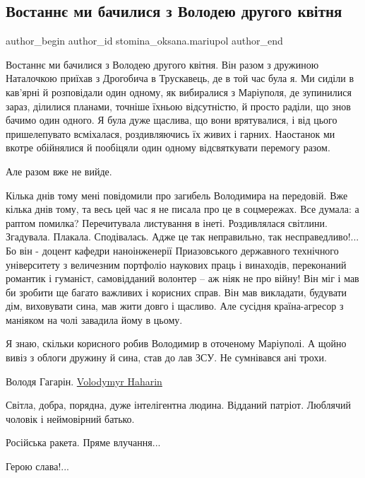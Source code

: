  
 
 
 
 

\subsection{Востаннє ми бачилися з Володею другого квітня}
\label{sec:26_02_2023.fb.stomina_oksana.mariupol.1.vostann__mi_bachilis}

\ifcmt
 author_begin
   author_id stomina_oksana.mariupol
 author_end
\fi

Востаннє ми бачилися з Володею другого квітня. Він разом з дружиною Наталочкою
приїхав з Дрогобича в Трускавець, де в той час була я. Ми сиділи в кав’ярні й
розповідали один одному, як вибиралися з Маріуполя, де зупинилися зараз,
ділилися планами, точніше їхньою відсутністю, й просто раділи, що знов бачимо
один одного.  Я була дуже щаслива, що вони врятувалися, і від цього
пришелепувато всміхалася, роздивляючись їх живих і гарних. Наостанок ми вкотре
обійнялися й пообіцяли один одному відсвяткувати перемогу разом. 

Але разом вже не вийде. 

Кілька днів тому мені повідомили про загибель Володимира на передовій. Вже
кілька днів тому, та весь цей час я не писала про це в соцмережах. Все думала:
а раптом помилка? Перечитувала листування в інеті. Роздивлялася світлини.
Згадувала. Плакала.  Сподівалась.  Адже це так неправильно, так
несправедливо!... Бо він - доцент кафедри наноінженерії Приазовського
державного технічного університету з величезним портфоліо наукових праць і
винаходів, переконаний романтик і гуманіст, самовідданий волонтер – аж ніяк не
про війну! Він міг і мав би зробити ще багато важливих і корисних справ. Він
мав викладати, будувати дім, виховувати сина, мав жити довго і щасливо. Але
сусідня країна-агресор з маніяком на чолі завадила йому в цьому.

Я знаю, скільки корисного робив Володимир в оточеному
Маріуполі. А щойно вивіз з облоги дружину й сина, став до
лав ЗСУ. Не сумнівався ані трохи.   

Володя Гагарін. \href{https://www.facebook.com/volodymyr.haharin}{Volodymyr Haharin}

Світла, добра, порядна, дуже інтелігентна людина. Відданий патріот. Люблячий
чоловік і неймовірний батько. 

Російська ракета. Пряме влучання... 

Герою слава!...
